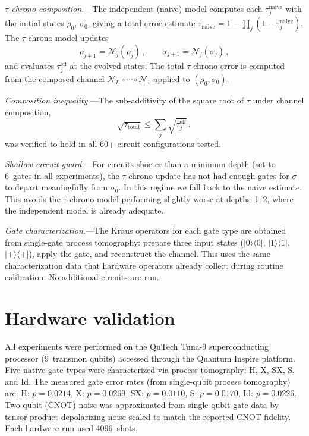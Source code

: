 \documentclass[prl,twocolumn,superscriptaddress,longbibliography]{revtex4-2}
\newcommand{\chan}{\mathcal{N}}
\begin{document}
\emph{$\tau$-chrono composition.}---The independent (naive) model computes each $\tau_j^{\text{naive}}$ with the initial states $\rho_0$, $\sigma_0$, giving a total error estimate $\tau_{\text{naive}} = 1 - \prod_j(1 - \tau_j^{\text{naive}})$. The $\tau$-chrono model updates
\begin{equation}\label{eq:update}
  \rho_{j+1} = \chan_j(\rho_j)\,, \qquad \sigma_{j+1} = \chan_j(\sigma_j)\,,
\end{equation}
and evaluates $\tau_j^{\text{eff}}$ at the evolved states. The total $\tau$-chrono error is computed from the composed channel $\chan_L \circ \cdots \circ \chan_1$ applied to $(\rho_0, \sigma_0)$.

\emph{Composition inequality.}---The sub-additivity of the square root of $\tau$ under channel composition,
\begin{equation}\label{eq:composition}
  \sqrt{\tau_{\text{total}}} \leq \sum_j \sqrt{\tau_j^{\text{eff}}}\,,
\end{equation}
was verified to hold in all 60+ circuit configurations tested.

\emph{Shallow-circuit guard.}---For circuits shorter than a minimum depth (set to 6~gates in all experiments), the $\tau$-chrono update has not had enough gates for $\sigma$ to depart meaningfully from $\sigma_0$. In this regime we fall back to the naive estimate. This avoids the $\tau$-chrono model performing slightly worse at depths~1--2, where the independent model is already adequate.

\emph{Gate characterization.}---The Kraus operators for each gate type are obtained from single-gate process tomography: prepare three input states ($|0\rangle\langle 0|$, $|1\rangle\langle 1|$, $|+\rangle\langle +|$), apply the gate, and reconstruct the channel. This uses the same characterization data that hardware operators already collect during routine calibration. No additional circuits are run.

\section{Hardware validation}

All experiments were performed on the QuTech Tuna-9 superconducting processor (9~transmon qubits) accessed through the Quantum Inspire platform. Five native gate types were characterized via process tomography: H, X, SX, S, and Id. The measured gate error rates (from single-qubit process tomography) are: H: $p = 0.0214$, X: $p = 0.0269$, SX: $p = 0.0110$, S: $p = 0.0170$, Id: $p = 0.0226$. Two-qubit (CNOT) noise was approximated from single-qubit gate data by tensor-product depolarizing noise scaled to match the reported CNOT fidelity. Each hardware run used 4096~shots.
\end{document}
